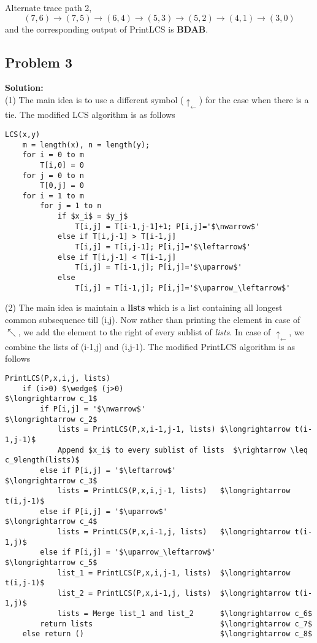 \documentclass[12pt,a4paper]{article}
\newcommand{\solution}{\noindent\textbf{Solution:}\\\indent}
\begin{document}
Alternate trace path 2,
\begin{equation*}
    (7,6) \rightarrow (7,5) \rightarrow (6,4) \rightarrow (5,3) \rightarrow (5,2) \rightarrow (4,1) \rightarrow (3,0)
\end{equation*}
and the corresponding output of PrintLCS is \textbf{BDAB}.

\newpage
\subsection*{Problem 3}
\solution
(1) The main idea is to use a different symbol ($\uparrow_\leftarrow$) for the case when there is a tie. The modified LCS algorithm is as follows
\begin{lstlisting}[mathescape=true]
LCS(x,y)
    m = length(x), n = length(y);
    for i = 0 to m
        T[i,0] = 0
    for j = 0 to n
        T[0,j] = 0
    for i = 1 to m
        for j = 1 to n
            if $x_i$ = $y_j$
                T[i,j] = T[i-1,j-1]+1; P[i,j]='$\nwarrow$'
            else if T[i,j-1] > T[i-1,j]
                T[i,j] = T[i,j-1]; P[i,j]='$\leftarrow$'
            else if T[i,j-1] < T[i-1,j]
                T[i,j] = T[i-1,j]; P[i,j]='$\uparrow$'
            else
                T[i,j] = T[i-1,j]; P[i,j]='$\uparrow_\leftarrow$'
\end{lstlisting}

(2) The main idea is maintain a \textbf{lists} which is a list containing all longest common subsequence till (i,j). Now rather than printing the element in case of $\nwarrow$, we add the element to the right of every sublist of \textit{lists}. In case of $\uparrow_\leftarrow$, we combine the lists of (i-1,j) and (i,j-1). The modified PrintLCS algorithm is as follows
\begin{lstlisting}[mathescape=true]
PrintLCS(P,x,i,j, lists)
    if (i>0) $\wedge$ (j>0)                             $\longrightarrow c_1$
        if P[i,j] = '$\nwarrow$'                         $\longrightarrow c_2$
            lists = PrintLCS(P,x,i-1,j-1, lists) $\longrightarrow t(i-1,j-1)$
            Append $x_i$ to every sublist of lists  $\rightarrow \leq c_9length(lists)$
        else if P[i,j] = '$\leftarrow$'                    $\longrightarrow c_3$
            lists = PrintLCS(P,x,i,j-1, lists)   $\longrightarrow t(i,j-1)$
        else if P[i,j] = '$\uparrow$'                     $\longrightarrow c_4$
            lists = PrintLCS(P,x,i-1,j, lists)   $\longrightarrow t(i-1,j)$
        else if P[i,j] = '$\uparrow_\leftarrow$'                    $\longrightarrow c_5$
            list_1 = PrintLCS(P,x,i,j-1, lists)  $\longrightarrow t(i,j-1)$
            list_2 = PrintLCS(P,x,i-1,j, lists)  $\longrightarrow t(i-1,j)$
            lists = Merge list_1 and list_2      $\longrightarrow c_6$
        return lists                             $\longrightarrow c_7$
    else return ()                               $\longrightarrow c_8$
\end{lstlisting}
\end{document}
